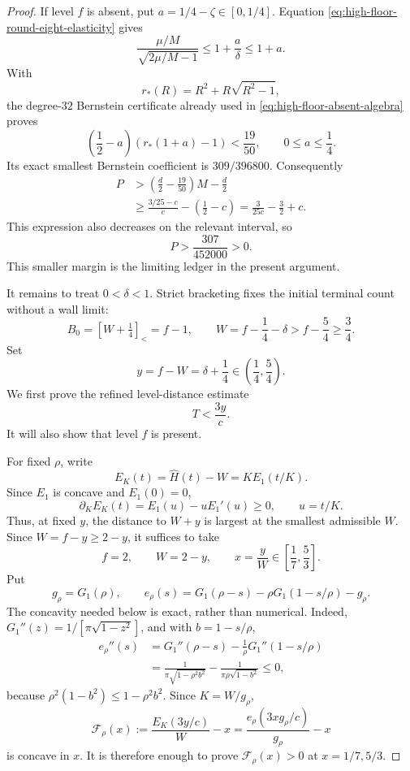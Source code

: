 \documentclass[11pt]{article}
\theoremstyle{remark}
\newcommand{\sbr}[1]{[#1]_{<}}
\begin{document}
\begin{proof}
If level $f$ is absent, put $a=1/4-\zeta\in[0,1/4]$.
Equation \eqref{eq:high-floor-round-eight-elasticity} gives
\[
 \frac{\mu/M}{\sqrt{2\mu/M-1}}
 \leq1+\frac a\delta\leq1+a.
\]
With
\[
 r_*(R)=R^2+R\sqrt{R^2-1},
\]
the degree-$32$ Bernstein certificate already used in
\eqref{eq:high-floor-absent-algebra} proves
\[
 \left(\frac12-a\right)(r_*(1+a)-1)<\frac{19}{50},
 \qquad 0\leq a\leq\frac14.
\]
Its exact smallest Bernstein coefficient is $309/396800$.  Consequently
\[
\begin{aligned}
 P
 &>\left(\frac d2-\frac{19}{50}\right)M-\frac d2\\
 &\geq\frac{3/25-c}{c}-\left(\frac12-c\right)
 =\frac3{25c}-\frac32+c.
\end{aligned}
\]
This expression also decreases on the relevant interval, so
\begin{equation}
 \boxed{P>\frac{307}{452000}>0.}
 \label{eq:high-floor-round-eight-absent}
\end{equation}
This smaller margin is the limiting ledger in the present argument.

It remains to treat $0<\delta<1$.  Strict bracketing fixes the initial
terminal count without a wall limit:
\begin{equation}
 B_0=\sbr{W+\tfrac14}=f-1,\qquad
 W=f-\frac14-\delta>f-\frac54\geq\frac34.
 \label{eq:high-floor-round-eight-B-zero}
\end{equation}
Set
\[
 y=f-W=\delta+\frac14\in\left(\frac14,\frac54\right).
\]
We first prove the refined level-distance estimate
\begin{equation}
 \boxed{T<\frac{3y}{c}.}
 \label{eq:high-floor-round-eight-level-distance}
\end{equation}
It will also show that level $f$ is present.

For fixed $\rho$, write
\[
 E_K(t)=\widehat H(t)-W=K E_1(t/K).
\]
Since $E_1$ is concave and $E_1(0)=0$,
\[
 \partial_KE_K(t)=E_1(u)-uE_1'(u)\geq0,
 \qquad u=t/K.
\]
Thus, at fixed $y$, the distance to $W+y$ is largest at the smallest
admissible $W$.  Since $W=f-y\geq2-y$, it suffices to take
\[
 f=2,\qquad W=2-y,\qquad
 x=\frac yW\in\left[\frac17,\frac53\right].
\]
Put
\[
 g_\rho=G_1(\rho),\qquad
 e_\rho(s)=G_1(\rho-s)-\rho G_1(1-s/\rho)-g_\rho.
\]
The concavity needed below is exact, rather than numerical.  Indeed,
$G_1''(z)=1/[\pi\sqrt{1-z^2}]$, and with $b=1-s/\rho$,
\[
\begin{aligned}
 e_\rho''(s)
 &=G_1''(\rho-s)-\frac1\rho G_1''(1-s/\rho)\\
 &=\frac1{\pi\sqrt{1-\rho^2b^2}}
   -\frac1{\pi\rho\sqrt{1-b^2}}\leq0,
\end{aligned}
\]
because $\rho^2(1-b^2)\leq1-\rho^2b^2$.  Since $K=W/g_\rho$,
\begin{equation}
 \mathcal F_\rho(x)
 :=\frac{E_K(3y/c)}W-x
 =\frac{e_\rho(3xg_\rho/c)}{g_\rho}-x
 \label{eq:high-floor-round-eight-concavity}
\end{equation}
is concave in $x$.  It is therefore enough to prove
$\mathcal F_\rho(x)>0$ at $x=1/7,5/3$.


\end{proof}
\end{document}
